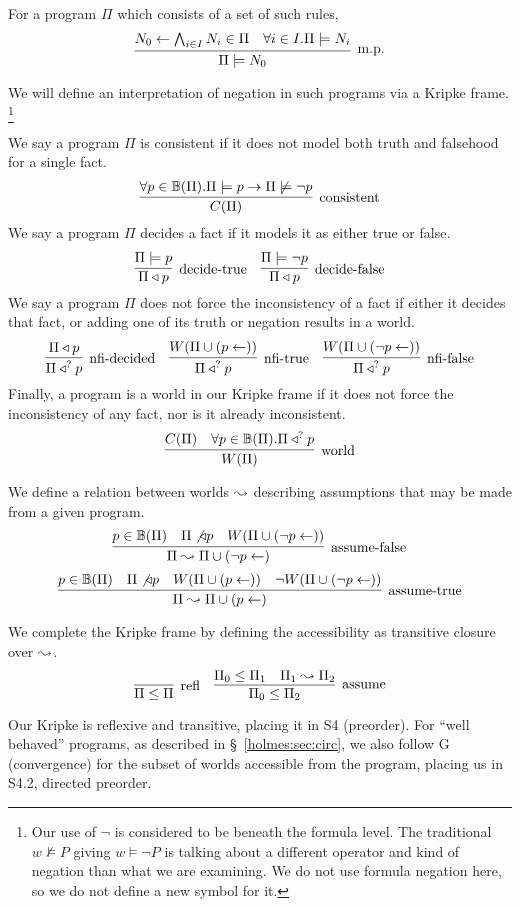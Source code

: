 For a program $\Pi$ which consists of a set of such rules,
\[
	\infer[\textrm{m.p.}]{\Pi \models N_0}{N_0 \leftarrow \bigwedge_{i \in I} N_i \in \Pi & \forall i \in I. \Pi \models N_i}
\]

We will define an interpretation of negation in such programs via a Kripke frame.
\footnote{Our use of $\neg$ is considered to be beneath the formula level.
The traditional $w \not \models P$ giving $w \models \neg P$ is talking about a different operator and kind of negation than what we are examining.
We do not use formula negation here, so we do not define a new symbol for it.}

We say a program $\Pi$ is consistent if it does not model both truth and falsehood for a single fact.
\[
	\infer[\textrm{consistent}]{\cons{\Pi}}{\forall p \in \hb(\Pi). \Pi \models p \imp \Pi \not \models \neg p}
\]
We say a program $\Pi$ decides a fact if it models it as either true or false.
\[
	\infer[\textrm{decide-true}]{\Pi \decides p}{\Pi \models p}
	\quad
	\infer[\textrm{decide-false}]{\Pi \decides p}{\Pi \models \neg p}
\]
We say a program $\Pi$ does not force the inconsistency of a fact if either it decides that fact, or adding one of its truth or negation results in a world.
\[
	\infer[\textrm{nfi-decided}]{\nfi{\Pi}{p}}{\Pi \decides p}
	\quad
	\infer[\textrm{nfi-true}]{\nfi{\Pi}{p}}{\world{\Pi \cup (p \leftarrow)}}
	\quad
	\infer[\textrm{nfi-false}]{\nfi{\Pi}{p}}{\world{\Pi \cup (\neg p \leftarrow)}}
\]
Finally, a program is a world in our Kripke frame if it does not force the inconsistency of any fact, nor is it already inconsistent.
\[
	\infer[\textrm{world}]{\world{\Pi}}{\cons{\Pi} & \forall p \in \hb(\Pi). \nfi{\Pi}{p}}
\]

We define a relation between worlds $\leadsto$ describing assumptions that may be made from a given program.
\[
	\infer[\textrm{assume-false}]{\Pi \stepass \Pi \cup (\neg p \leftarrow)}{p \in \hb(\Pi) & \Pi \not \decides p & \world{\Pi \cup (\neg p \leftarrow)}}
\]
\[
	\infer[\textrm{assume-true}]{\Pi \stepass \Pi \cup (p \leftarrow)}{p \in \hb(\Pi) & \Pi \not \decides p & \world{\Pi \cup (p \leftarrow)} & \neg \world{\Pi \cup (\neg p \leftarrow)}}
\]

We complete the Kripke frame by defining the accessibility as transitive closure over $\leadsto$.
\[
	\infer[\textrm{refl}]{\Pi \leq \Pi}{}
	\quad
	\infer[\textrm{assume}]{\Pi_0 \leq \Pi_2}{\Pi_0 \leq \Pi_1 & \Pi_1 \stepass \Pi_2}
\]

Our Kripke is reflexive and transitive, placing it in S4 (preorder).
For ``well behaved'' programs, as described in \S~\ref{holmes:sec:circ}, we also follow G (convergence) for the subset of worlds accessible from the program, placing us in S4.2, directed preorder.

